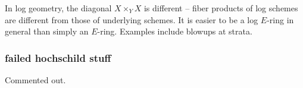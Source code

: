 \documentclass[11pt,reqno]{amsart}
\theoremstyle{definition}
\newcommand{\Leo}[2][inline]{\todo[linecolor=blue,backgroundcolor=blue!25,bordercolor=blue,#1,shadow,author=Leo]{#2}} %
\begin{document}
In log geometry, the diagonal $X \times_Y X$ is different -- fiber products of log schemes are different from those of underlying schemes. It is easier to be a log $E$-ring in general than simply an $E$-ring. Examples include blowups at strata. 







\subsubsection{failed hochschild stuff}

Commented out. 

\begin{comment}

Write $R^{\otimes_S n} = R \otimes_S \cdots \otimes_S R$ for the tensor product of $n$ copies of $R$ over $S$. There is an augmented simplicial object
\[\cdots R^{\otimes_S 3} \rightrightarrows R^{\otimes_S 2} \to R\]
called the bar resolution \cite[\S 8.6.12]{weibel}. Let $C_\bullet$ be the chain complex 
\[C_\bullet : \qquad \cdots R^{\otimes_S 3} \to R^{\otimes_S 2} \to R,\]
where the maps are alternating sums $\sum (-1)^k d_k$ of the face maps $d_k$. That is:
\[C_k = R^{\otimes_S k+2}, \qquad d(r_0 \otimes \cdots \otimes r_{k+1}) \coloneqq \sum_{0 \leq i \leq k} (-1)^i r_0 \otimes \cdots \otimes r_i r_{i+1} \otimes \cdots \otimes r_{k+1}.\]
\Leo{This chain complex is exact! That's the point of the bar resolution!}




This is the bar resolution $B(R, R)$, not the Hochschild complex. The difference is
\[HH(R, N) = B(R, R) \otimes_{R \otimes_S R^{\rm op}} N\] 
if $N$ is a bimodule. Our rings are commutative, $R = R^{\rm op}$. So cohomology of the bar complex may be thought of as Hochschild of the free bimodule
\[HH(R, R \otimes_S R) = B(R, R) \otimes_{R \otimes_S R} R \otimes_S R = B(R, R).\]



Because $C_\bullet$ is a complex, any $f : R \to N$ restricts to a map $\varphi : R \otimes_S R \to N$ that restricts to zero on $R^{\otimes_S 3}$. In order for $\varphi$ to come from a map $f : R \to N$, it must be the case that
\[\varphi|_{R^{\otimes_S 3}} = 0.\]
I.e., $\varphi$ must be a Hochschild cocycle. 
\Leo{This is automatic! The alternating sum map $R\otimes_S R \to R$ is the zero map! I'm off one degree somehow}
\Leo{Not Hochschild! This is the bar construction}



\end{comment}
\end{document}
